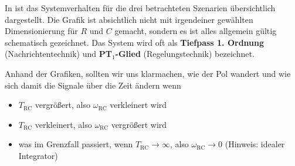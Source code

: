 \begin{Loesung}
\begin{itemize}
In  ist das Systemverhalten für die drei betrachteten Szenarien
übersichtlich dargestellt.
%
Die Grafik ist absichtlich nicht mit irgendeiner gewählten Dimensionierung
für $R$ und $C$ gemacht, sondern es ist alles allgemein gültig schematisch gezeichnet.
Das System wird oft als \textbf{Tiefpass 1. Ordnung} (Nachrichtentechnik) und
\textbf{PT$_1$-Glied} (Regelungstechnik) bezeichnet.

Anhand der Grafiken, sollten wir uns klarmachen, wie der Pol wandert und
wie sich damit die Signale über die Zeit ändern
wenn
\begin{itemize}
  \item $T_\mathrm{RC}$ vergrößert, also $\omega_\mathrm{RC}$ verkleinert wird
  \item $T_\mathrm{RC}$ verkleinert, also $\omega_\mathrm{RC}$ vergrößert wird
  \item was im Grenzfall passiert, wenn $T_\mathrm{RC}\to\infty$, also
  $\omega_\mathrm{RC}\to 0$ (Hinweis: idealer Integrator)
\end{itemize}


\end{itemize}
\end{Loesung}


